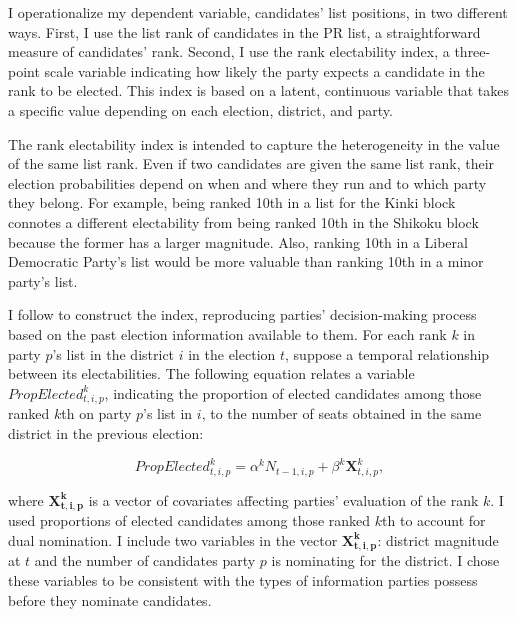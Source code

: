 \documentclass[a4paper, 12pt]{article}
\begin{document}
I operationalize my dependent variable, candidates' list positions, in two different ways. First, I use the list rank of candidates in the PR list, a straightforward measure of candidates' rank. Second, I use the rank electability index, a three-point scale variable indicating how likely the party expects a candidate in the rank to be elected. This index is based on a latent, continuous variable that takes a specific value depending on each election, district, and party. 

The rank electability index is intended to capture the heterogeneity in the value of the same list rank. Even if two candidates are given the same list rank, their election probabilities depend on when and where they run and to which party they belong. For example, being ranked 10th in a list for the Kinki block connotes a different electability from being ranked 10th in the Shikoku block because the former has a larger magnitude. Also, ranking 10th in a Liberal Democratic Party's list would be more valuable than ranking 10th in a minor party's list.

I follow \citet{buisseret2022party} to construct the index, reproducing parties' decision-making process based on the past election information available to them. \footnotemark{} For each rank $k$ in party $p$'s list in the district $i$ in the election $t$, suppose a temporal relationship between its electabilities. The following equation relates a variable $PropElected^k_{t,i,p}$, indicating the proportion of elected candidates among those ranked $k$th on party $p$'s list in $i$, to the number of seats obtained in the same district in the previous election: 


\begin{equation} \label{eq:rankReg}
PropElected^{k}_{t, i, p} = \alpha^k N_{t-1, i, p}  + \beta^k \mathbf{X}^{k}_{t,i,p}, 
\end{equation}

\noindent where $\mathbf{X^k_{t,i,p}}$ is a vector of covariates affecting parties' evaluation of the rank $k$. I used proportions of elected candidates among those ranked $k$th to account for dual nomination.\footnotemark{} I include two variables in the vector $\mathbf{X^k_{t,i,p}}$: district magnitude at $t$ and the number of candidates party $p$ is nominating for the district. I chose these variables to be consistent with the types of information parties possess before they nominate candidates. 
\end{document}
